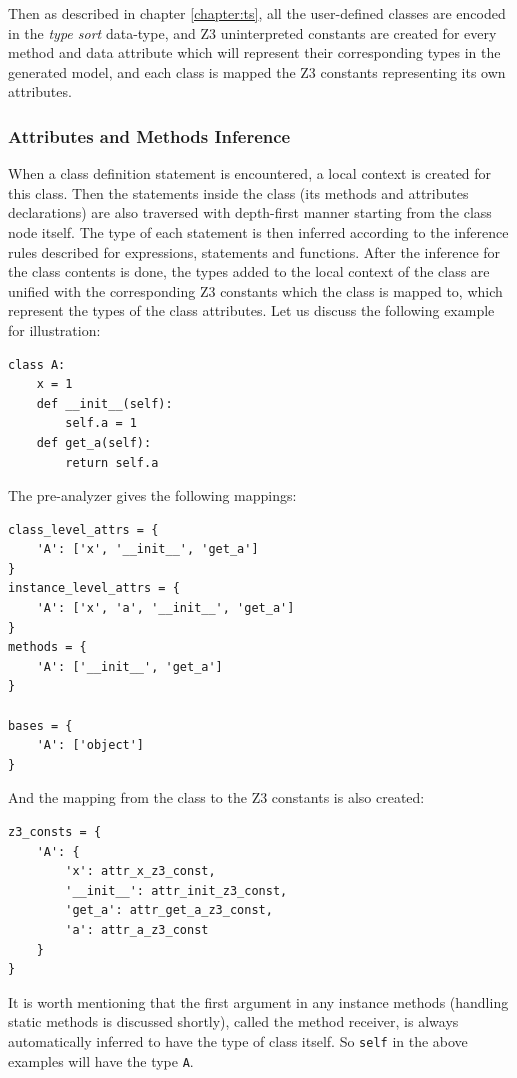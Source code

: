 Then as described in chapter \ref{chapter:ts}, all the user-defined classes are encoded in the \textit{type sort} data-type, and Z3 uninterpreted constants are created for every method and data attribute which will represent their corresponding types in the generated model, and each class is mapped the Z3 constants representing its own attributes.

\subsubsection{Attributes and Methods Inference}
When a class definition statement is encountered, a local context is created for this class. Then the statements inside the class (its methods and attributes declarations) are also traversed with depth-first manner starting from the class node itself. The type of each statement is then inferred according to the inference rules described for expressions, statements and functions. After the inference for the class contents is done, the types added to the local context of the class are unified with the corresponding Z3 constants which the class is mapped to, which represent the types of the class attributes. Let us discuss the following example for illustration:

\begin{lstlisting}
class A:
	x = 1
	def __init__(self):
		self.a = 1
	def get_a(self):
		return self.a
\end{lstlisting}

The pre-analyzer gives the following mappings:
\begin{lstlisting}
class_level_attrs = {
	'A': ['x', '__init__', 'get_a']
}
instance_level_attrs = {
	'A': ['x', 'a', '__init__', 'get_a']
}
methods = {
	'A': ['__init__', 'get_a']
}

bases = {
	'A': ['object']
}
\end{lstlisting}

And the mapping from the class to the Z3 constants is also created:
\begin{lstlisting}
z3_consts = {
	'A': {
		'x': attr_x_z3_const,
		'__init__': attr_init_z3_const,
		'get_a': attr_get_a_z3_const,
		'a': attr_a_z3_const
	}
}
\end{lstlisting}

It is worth mentioning that the first argument in any instance methods (handling static methods is discussed shortly), called the method receiver, is always automatically inferred to have the type of class itself. So \lstinline|self| in the above examples will have the type \lstinline|A|. \\

